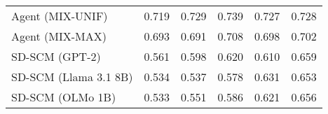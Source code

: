 \begin{table}[h!]
\begin{tabular}{lccccc}
    Agent (MIX-UNIF) & 0.719 & 0.729 & \cellcolor{silver!30}0.739 & 0.727 & 0.728 \\
    Agent (MIX-MAX) & 0.693 & 0.691 & \cellcolor{bronze!30}0.708 & 0.698 & 0.702 \\
    \arrayrulecolor{black!50!}\midrule
    SD-SCM (GPT-2) & 0.561 & 0.598 & 0.620 & 0.610 & 0.659 \\
    SD-SCM (Llama 3.1 8B) & 0.534 & 0.537 & 0.578 & 0.631 & 0.653 \\
    SD-SCM (OLMo 1B) & 0.533 & 0.551 & 0.586 & 0.621 & 0.656 \\
    \bottomrule
    \end{tabular}
\end{table}